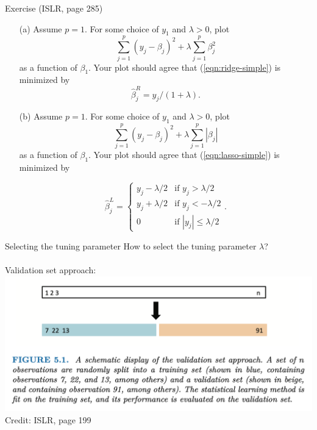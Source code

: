 \documentclass{beamer}
\begin{document}
  \begin{frame}{Exercise (ISLR, page 285)}
    \small
    \begin{itemize}
      \item[(a)] Assume $p = 1$. For some choice of $y_1$ and $\lambda > 0$, plot
        \begin{equation}
          \label{eqn:ridge-simple}
          \sum_{j = 1}^p(y_j - \beta_j)^2 + \lambda \sum_{j = 1}^p \beta_j^2
        \end{equation}
        as a function of $\beta_1$. Your plot should agree that (\ref{eqn:ridge-simple}) is minimized by
        $$\hat \beta_j^R = y_j / (1 + \lambda).$$
      \item[(b)] Assume $p = 1$. For some choice of $y_1$ and $\lambda > 0$, plot
        \begin{equation}
          \label{eqn:lasso-simple}
          \sum_{j = 1}^p(y_j - \beta_j)^2 + \lambda \sum_{j = 1}^p |\beta_j|
        \end{equation}
        as a function of $\beta_1$. Your plot should agree that (\ref{eqn:lasso-simple}) is minimized by

        $$
          \hat \beta_j^L = \begin{cases}
            y_j - \lambda/2 & \mbox{if }y_j > \lambda / 2\\
            y_j + \lambda/2 & \mbox{if }y_j < -\lambda / 2\\
            0               & \mbox{if }|y_j| \le \lambda / 2
          \end{cases}.
        $$
    \end{itemize}
  \end{frame}

  \begin{frame}{Selecting the tuning parameter}
    How to select the tuning parameter $\lambda$?\\
    ~\\
    Validation set approach:\\
    \includegraphics[width = \textwidth]{images/validation_set.png}\\
    \hfill \footnotesize Credit: ISLR, page 199
  \end{frame}
\end{document}
